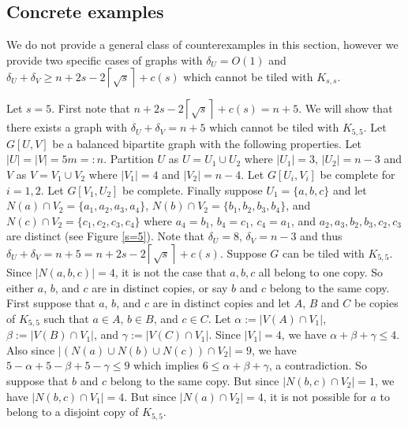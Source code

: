\documentclass[oneside,12pt]{memoir}
\newcommand{\croot}[1]{\left\lceil\sqrt{#1}\right\rceil}
\begin{document}
\subsection{Concrete examples}

% 

We do not provide a general class of counterexamples in this section, however we provide two specific cases of graphs with $\delta_U=O(1)$ and $\delta_U+\delta_V\geq n+2s-2\croot{s}+c(s)$ which cannot be tiled with $K_{s,s}$.

Let $s=5$.  First note that $n+2s-2\croot{s}+c(s)=n+5$.  We will show that there exists a graph with $\delta_U+\delta_V=n+5$ which cannot be tiled with $K_{5,5}$.  Let $G[U,V]$ be a balanced bipartite graph with the following properties.  Let $|U|=|V|=5m=:n$.  Partition $U$ as $U=U_1\cup U_2$ where $|U_1|=3$, $|U_2|=n-3$ and $V$ as $V=V_1\cup V_2$ where $|V_1|=4$ and $|V_2|=n-4$.  Let $G[U_i, V_i]$ be complete for $i=1,2$.  Let $G[V_1, U_2]$ be complete.  Finally suppose $U_1=\{a,b,c\}$ and let $N(a)\cap V_2=\{a_1, a_2, a_3, a_4\}$, $N(b)\cap V_2=\{b_1, b_2, b_3, b_4\}$, and $N(c)\cap V_2=\{c_1, c_2, c_3, c_4\}$ where $a_4=b_1$, $b_4=c_1$, $c_4=a_1$, and $a_2, a_3, b_2, b_3, c_2, c_3$ are distinct (see Figure \ref{s=5}).  Note that $\delta_U=8$, $\delta_V=n-3$ and thus $\delta_U+\delta_V=n+5=n+2s-2\croot{s}+c(s)$.  Suppose $G$ can be tiled with $K_{5,5}$.  Since $|N(a,b,c)|=4$, it is not the case that $a,b,c$ all belong to one copy.  So either $a$, $b$, and $c$ are in distinct copies, or say $b$ and $c$ belong to the same copy.  First suppose that $a$, $b$, and $c$ are in distinct copies and let $A$, $B$ and $C$ be copies of $K_{5,5}$ such that $a\in A$, $b\in B$, and $c\in C$.  Let $\alpha:=|V(A)\cap V_1|$, $\beta:=|V(B)\cap V_1|$, and $\gamma:=|V(C)\cap V_1|$.  Since $|V_1|=4$, we have $\alpha+\beta+\gamma\leq 4$.  Also since $|(N(a)\cup N(b)\cup N(c))\cap V_2|=9$, we have $5-\alpha+5-\beta+5-\gamma \leq 9$ which implies $6\leq \alpha+\beta+\gamma $, a contradiction.  So suppose that $b$ and $c$ belong to the same copy.  But since $|N(b, c)\cap V_2|=1$, we have $|N(b,c)\cap V_1|=4$.  But since $|N(a)\cap V_2|=4$, it is not possible for $a$ to belong to a disjoint copy of $K_{5,5}$.
\end{document}
